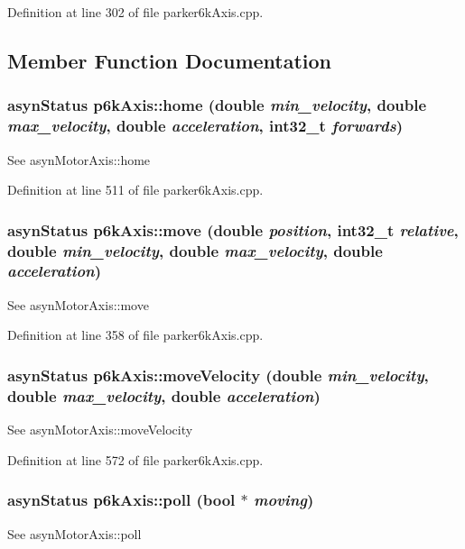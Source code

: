 Definition at line 302 of file parker6kAxis.cpp.

\subsection{Member Function Documentation}
\hypertarget{classp6kAxis_aa4e5af85ebd67bfa99ffb6a9b0c931d5}{
\subsubsection[{home}]{\setlength{\rightskip}{0pt plus 5cm}asynStatus p6kAxis::home (double {\em min\_\-velocity}, \/  double {\em max\_\-velocity}, \/  double {\em acceleration}, \/  int32\_\-t {\em forwards})}}
\label{classp6kAxis_aa4e5af85ebd67bfa99ffb6a9b0c931d5}
See asynMotorAxis::home 

Definition at line 511 of file parker6kAxis.cpp.\hypertarget{classp6kAxis_a87b21ab183017f23c2d606a0d36fa097}{
\subsubsection[{move}]{\setlength{\rightskip}{0pt plus 5cm}asynStatus p6kAxis::move (double {\em position}, \/  int32\_\-t {\em relative}, \/  double {\em min\_\-velocity}, \/  double {\em max\_\-velocity}, \/  double {\em acceleration})}}
\label{classp6kAxis_a87b21ab183017f23c2d606a0d36fa097}
See asynMotorAxis::move 

Definition at line 358 of file parker6kAxis.cpp.\hypertarget{classp6kAxis_ace0a936ffe4e3325b0b306bb6c393952}{
\subsubsection[{moveVelocity}]{\setlength{\rightskip}{0pt plus 5cm}asynStatus p6kAxis::moveVelocity (double {\em min\_\-velocity}, \/  double {\em max\_\-velocity}, \/  double {\em acceleration})}}
\label{classp6kAxis_ace0a936ffe4e3325b0b306bb6c393952}
See asynMotorAxis::moveVelocity 

Definition at line 572 of file parker6kAxis.cpp.\hypertarget{classp6kAxis_a988407e14bc4d01536f92efa24cc6b19}{
\subsubsection[{poll}]{\setlength{\rightskip}{0pt plus 5cm}asynStatus p6kAxis::poll (bool $\ast$ {\em moving})}}
\label{classp6kAxis_a988407e14bc4d01536f92efa24cc6b19}
See asynMotorAxis::poll 

